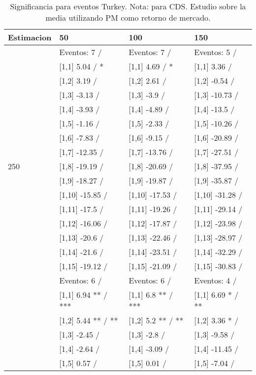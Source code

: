 \begin{table}

\caption{Significancia para eventos Turkey. Nota: para CDS. Estudio sobre la media utilizando PM como retorno de mercado.}
\centering
\begin{tabular}[t]{llll}
\toprule
Estimacion & 50 & 100 & 150\\
\midrule
 & Eventos:  7 / & Eventos:  7 / & Eventos:  5 /\\
 & {}[1,1] 5.04  / * & {}[1,1] 4.69  / * & {}[1,1] 3.36  /\\
 & {}[1,2] 3.19  / & {}[1,2] 2.61  / & {}[1,2] -0.54  /\\
 & {}[1,3] -3.13  / & {}[1,3] -3.9  / & {}[1,3] -10.73  /\\
 & {}[1,4] -3.93  / & {}[1,4] -4.89  / & {}[1,4] -13.5  /\\
\addlinespace
 & {}[1,5] -1.16  / & {}[1,5] -2.33  / & {}[1,5] -10.26  /\\
 & {}[1,6] -7.83  / & {}[1,6] -9.15  / & {}[1,6] -20.89  /\\
 & {}[1,7] -12.35  / & {}[1,7] -13.76  / & {}[1,7] -27.51  /\\
250 & {}[1,8] -19.19  / & {}[1,8] -20.69  / & {}[1,8] -37.95  /\\
 & {}[1,9] -18.27  / & {}[1,9] -19.87  / & {}[1,9] -35.87  /\\
\addlinespace
 & {}[1,10] -15.85  / & {}[1,10] -17.53  / & {}[1,10] -31.28  /\\
 & {}[1,11] -17.5  / & {}[1,11] -19.26  / & {}[1,11] -29.14  /\\
 & {}[1,12] -16.06  / & {}[1,12] -17.87  / & {}[1,12] -23.98  /\\
 & {}[1,13] -20.6  / & {}[1,13] -22.46  / & {}[1,13] -28.97  /\\
 & {}[1,14] -21.6  / & {}[1,14] -23.51  / & {}[1,14] -32.29  /\\
\addlinespace
 & {}[1,15] -19.12  / & {}[1,15] -21.09  / & {}[1,15] -30.83  /\\
 & Eventos:  6 / & Eventos:  6 / & Eventos:  4 /\\
 & {}[1,1] 6.94 ** / *** & {}[1,1] 6.8 ** / *** & {}[1,1] 6.69 * / **\\
 & {}[1,2] 5.44 ** / ** & {}[1,2] 5.2 ** / ** & {}[1,2] 3.36 * /\\
 & {}[1,3] -2.45  / & {}[1,3] -2.8  / & {}[1,3] -9.58  /\\
\addlinespace
 & {}[1,4] -2.64  / & {}[1,4] -3.09  / & {}[1,4] -11.45  /\\
 & {}[1,5] 0.57  / & {}[1,5] 0.01  / & {}[1,5] -7.04  /\\

\end{tabular}
\end{table}
